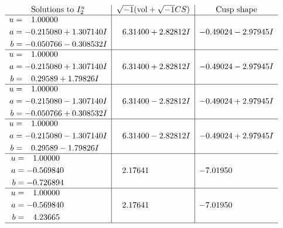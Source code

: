 \documentclass[1p]{elsarticle_modified}
\theoremstyle{definition}
\newcommand{\I}{\sqrt{-1}}
\begin{document}
$$\begin{array}{c|c|c}  
\text{Solutions to }I^u_{2}& \I (\text{vol} + \sqrt{-1}CS) & \text{Cusp shape}\\
 \hline 
\begin{aligned}
u &= \phantom{-}1.00000\phantom{ +0.000000I} \\
a &= -0.215080 + 1.307140 I \\
b &= -0.050766 - 0.308532 I\end{aligned}
 & \phantom{-}6.31400 + 2.82812 I & -0.49024 - 2.97945 I \\ \hline\begin{aligned}
u &= \phantom{-}1.00000\phantom{ +0.000000I} \\
a &= -0.215080 + 1.307140 I \\
b &= \phantom{-}0.29589 + 1.79826 I\end{aligned}
 & \phantom{-}6.31400 + 2.82812 I & -0.49024 - 2.97945 I \\ \hline\begin{aligned}
u &= \phantom{-}1.00000\phantom{ +0.000000I} \\
a &= -0.215080 - 1.307140 I \\
b &= -0.050766 + 0.308532 I\end{aligned}
 & \phantom{-}6.31400 - 2.82812 I & -0.49024 + 2.97945 I \\ \hline\begin{aligned}
u &= \phantom{-}1.00000\phantom{ +0.000000I} \\
a &= -0.215080 - 1.307140 I \\
b &= \phantom{-}0.29589 - 1.79826 I\end{aligned}
 & \phantom{-}6.31400 - 2.82812 I & -0.49024 + 2.97945 I \\ \hline\begin{aligned}
u &= \phantom{-}1.00000\phantom{ +0.000000I} \\
a &= -0.569840\phantom{ +0.000000I} \\
b &= -0.726894\phantom{ +0.000000I}\end{aligned}
 & \phantom{-}2.17641\phantom{ +0.000000I} & -7.01950\phantom{ +0.000000I} \\ \hline\begin{aligned}
u &= \phantom{-}1.00000\phantom{ +0.000000I} \\
a &= -0.569840\phantom{ +0.000000I} \\
b &= \phantom{-}4.23665\phantom{ +0.000000I}\end{aligned}
 & \phantom{-}2.17641\phantom{ +0.000000I} & -7.01950\phantom{ +0.000000I}\\
 \hline 
 \end{array}$$\newpage\newpage\renewcommand{\arraystretch}{1}
\end{document}
